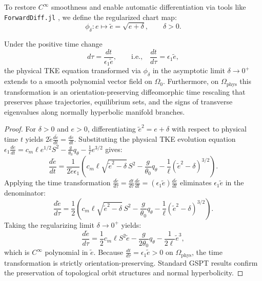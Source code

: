 To restore $C^\infty$ smoothness and enable automatic differentiation via tools like \texttt{ForwardDiff.jl} \citep{Rackauckas2017DifferentialEquations}, we define the regularized chart map:
\begin{equation}
\phi_\delta : e \mapsto \tilde e = \sqrt{e + \delta}, \qquad \delta > 0.
\end{equation}

\begin{proposition}
Under the positive time change
\begin{equation}
d\tau = \frac{dt}{\epsilon_1 \tilde e}, \qquad \text{i.e.,} \quad \frac{dt}{d\tau} = \epsilon_1 \tilde e,
\end{equation}
the physical TKE equation transformed via $\phi_\delta$ in the asymptotic limit $\delta \to 0^+$ extends to a smooth polynomial vector field on $\Omega_0$. Furthermore, on $\Omega_{\mathrm{phys}}$ this transformation is an orientation-preserving diffeomorphic time rescaling that preserves phase trajectories, equilibrium sets, and the signs of transverse eigenvalues along normally hyperbolic manifold branches.
\end{proposition}

\begin{proof}
For $\delta > 0$ and $e > 0$, differentiating $\tilde e^2 = e + \delta$ with respect to physical time $t$ yields $2\tilde e \frac{d\tilde e}{dt} = \frac{de}{dt}$. Substituting the physical TKE evolution equation $\epsilon_1 \frac{de}{dt} = c_m \ell e^{1/2} S^2 - \frac{g}{\theta_0} q_\theta - \frac{1}{\ell} e^{3/2}$ gives:
\begin{equation}
\frac{d\tilde e}{dt} = \frac{1}{2\tilde e \epsilon_1} \left( c_m \ell \sqrt{\tilde e^2 - \delta}\,S^2 - \frac{g}{\theta_0} q_\theta - \frac{1}{\ell}(\tilde e^2 - \delta)^{3/2} \right).
\end{equation}
Applying the time transformation $\frac{d\tilde e}{d\tau} = \frac{dt}{d\tau}\frac{d\tilde e}{dt} = (\epsilon_1 \tilde e)\frac{d\tilde e}{dt}$ eliminates $\epsilon_1 \tilde e$ in the denominator:
\begin{equation}
\frac{d\tilde e}{d\tau} = \frac{1}{2}\left( c_m \ell \sqrt{\tilde e^2 - \delta}\,S^2 - \frac{g}{\theta_0} q_\theta - \frac{1}{\ell}(\tilde e^2 - \delta)^{3/2} \right).
\end{equation}
Taking the regularizing limit $\delta \to 0^+$ yields:
\begin{equation}
\frac{d\tilde e}{d\tau} = \frac{1}{2} c_m \ell S^2 \tilde e - \frac{g}{2\theta_0} q_\theta - \frac{1}{2\ell} \tilde e^3,
\end{equation}
which is $C^\infty$ polynomial in $\tilde e$. Because $\frac{dt}{d\tau} = \epsilon_1 \tilde e > 0$ on $\Omega_{\mathrm{phys}}$, the time transformation is strictly orientation-preserving. Standard GSPT results \citep{Fenichel1979, Kuehn2015} confirm the preservation of topological orbit structures and normal hyperbolicity.
\end{proof}

